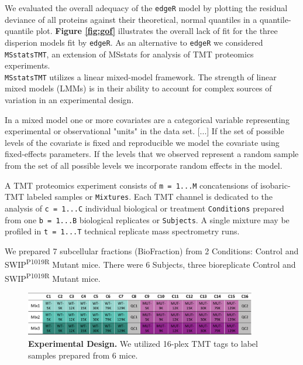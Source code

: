 \documentclass[11pt]{elife}\usepackage[]{graphicx}\usepackage[]{color}
\begin{document}
\begin{fullwidth}
We evaluated the overall adequacy of the \texttt{edgeR} model by plotting the 
residual deviance of all proteins against their theoretical, 
normal quantiles in a quantile-quantile plot. \textbf{Figure \ref{fig:gof}} 
illustrates the overall lack of fit for the three disperion models fit by 
\texttt{edgeR}.  As an alternative to \texttt{edgeR} we considered 
\texttt{MSstatsTMT}, an extension of MSstats for analysis of TMT proteomics
experiments. \\

\texttt{MSstatsTMT} utilizes a linear mixed-model framework. The strength of 
linear mixed models (LMMs) is in their ability to account for complex sources of 
variation in an experimental design. 

\begin{displayquote}
	In a mixed model one or more covariates 
	are a categorical variable  representing experimental or 
	observational "units" in the data set. 
	[...]
	If the set of possible levels of the covariate is fixed and reproducible 
	we model the covariate using fixed-effects parameters. 
	If the levels that we observed represent a random sample from
	the set of all possible levels we incorporate random effects in the
	model.
\end{displayquote}

A TMT proteomics experiment consists of \texttt{m = 1...M} concatensions of 
isobaric-TMT labeled samples or \texttt{Mixtures}. 
Each TMT channel is dedicated to the analysis of \texttt{c = 1...C}
individual biological or treatment \texttt{Conditions} prepared from one
\texttt{b = 1...B} biological replicates or \texttt{Subjects}. 
A single mixture may be profiled in \texttt{t = 1...T} technical replicate 
mass spectrometry runs. 

We prepared 7 subcellular fractions (BioFraction) from 2 Conditions: 
Control and SWIP\textsuperscript{P1019R} Mutant mice. 
There were 6 Subjects, three bioreplicate Control and 
SWIP\textsuperscript{P1019R} Mutant mice.

\begin{figure}[h]
  \begin{fullwidth}
  \begin{center}
	  \includegraphics[width=0.9\textwidth,keepaspectratio]{design}
	  \caption{\textbf{Experimental Design.} We utilized 16-plex
	  TMT tags to label samples prepared from 6 mice.}
	  \label{fig:design}
  \end{center}
  \end{fullwidth}
\end{figure}


\end{fullwidth}
\end{document}
